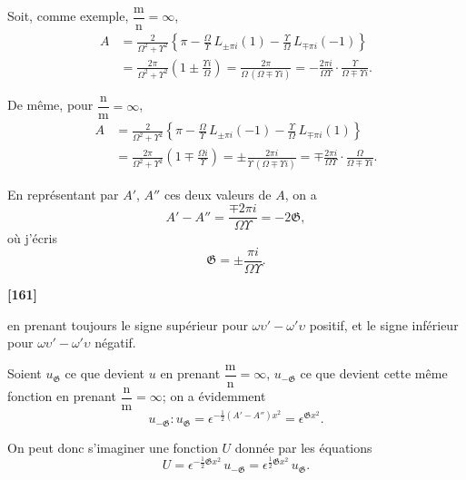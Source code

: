 \documentclass[11pt,a4paper]{book}
\begin{document}
Soit, comme exemple, $\dfrac{\mathrm{m}}{\mathrm{n}} = \infty$,
\begin{align*}
A &= \frac{2}{\Omega^2 + \Upsilon^2} \left\{\pi - \frac{\Omega}{\Upsilon}\, L_{\pm\pi i}(1) - \frac{\Upsilon}{\Omega}\, L_{\mp\pi i}(-1)\right\}\\
&= \frac{2\pi}{\Omega^2 + \Upsilon^2} \left(1 \pm \frac{\Upsilon i}{\Omega}\right)
= \frac{2\pi}{\Omega\, (\Omega \mp \Upsilon i)}
= -\frac{2\pi i}{\Omega\Upsilon} \cdot \frac{\Upsilon}{\Omega \mp \Upsilon i}.
\end{align*}

De m\^eme, pour $\dfrac{\mathrm{n}}{\mathrm{m}} = \infty$,
\begin{align*}
A &= \frac{2}{\Omega^2 + \Upsilon^2} \left\{\pi - \frac{\Omega}{\Upsilon}\, L_{\pm\pi i}(-1) - \frac{\Upsilon}{\Omega}\, L_{\mp\pi i}(1)\right\}\\
&= \frac{2\pi}{\Omega^2 + \Upsilon^2} \left(1 \mp \frac{\Omega i}{\Upsilon}\right)
= \pm \frac{2\pi i}{\Upsilon\, (\Omega \mp \Upsilon i)}
= \mp \frac{2\pi i}{\Omega\Upsilon} \cdot \frac{\Omega}{\Omega \mp \Upsilon i}.
\end{align*}

En repr\'esentant par $A'$, $A''$ ces deux valeurs de $A$, on a
\begin{equation}
A' - A'' = \frac{\mp 2\pi i}{\Omega\Upsilon} = -2\mathfrak{G}, \tag{10}
\end{equation}
o\`u j'\'ecris
\begin{equation}
\mathfrak{G} = \pm \frac{\pi i}{\Omega\Upsilon}. \tag{11}
\end{equation}

\textbf{[161]}

en prenant toujours le signe sup\'erieur pour $\omega\upsilon' - \omega'\upsilon$ positif, et le signe inf\'erieur pour
$\omega\upsilon' - \omega'\upsilon$ n\'egatif.

Soient $u_{\mathfrak{G}}$ ce que devient $u$ en prenant $\dfrac{\mathrm{m}}{\mathrm{n}} = \infty$, $u_{-\mathfrak{G}}$ ce que devient cette m\^eme
fonction en prenant $\dfrac{\mathrm{n}}{\mathrm{m}} = \infty$; on a \'evidemment
\[u_{-\mathfrak{G}} : u_{\mathfrak{G}} = \epsilon^{-\frac{1}{2}(A' - A'')x^2} = \epsilon^{\mathfrak{G}x^2}.\]

On peut donc s'imaginer une fonction $U$ donn\'ee par les \'equations
\begin{equation}
U = \epsilon^{-\frac{1}{2}\mathfrak{G}x^2}\, u_{-\mathfrak{G}} = \epsilon^{\frac{1}{2}\mathfrak{G}x^2}\, u_{\mathfrak{G}}. \tag{12}
\end{equation}
\end{document}
